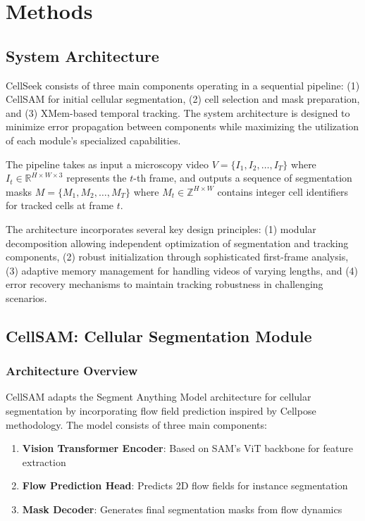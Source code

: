 \documentclass[12pt]{article}
\begin{document}
\section{Methods}

\subsection{System Architecture}


CellSeek consists of three main components operating in a sequential pipeline: (1) CellSAM for initial cellular segmentation, (2) cell selection and mask preparation, and (3) XMem-based temporal tracking. The system architecture is designed to minimize error propagation between components while maximizing the utilization of each module's specialized capabilities.

The pipeline takes as input a microscopy video $V = \{I_1, I_2, \ldots, I_T\}$ where $I_t \in \mathbb{R}^{H \times W \times 3}$ represents the $t$-th frame, and outputs a sequence of segmentation masks $M = \{M_1, M_2, \ldots, M_T\}$ where $M_t \in \mathbb{Z}^{H \times W}$ contains integer cell identifiers for tracked cells at frame $t$.

The architecture incorporates several key design principles: (1) modular decomposition allowing independent optimization of segmentation and tracking components, (2) robust initialization through sophisticated first-frame analysis, (3) adaptive memory management for handling videos of varying lengths, and (4) error recovery mechanisms to maintain tracking robustness in challenging scenarios.

\subsection{CellSAM: Cellular Segmentation Module}

\subsubsection{Architecture Overview}

CellSAM adapts the Segment Anything Model architecture for cellular segmentation by incorporating flow field prediction inspired by Cellpose methodology. The model consists of three main components:

\begin{enumerate}
  \item \textbf{Vision Transformer Encoder}: Based on SAM's ViT backbone for feature extraction
  \item \textbf{Flow Prediction Head}: Predicts 2D flow fields for instance segmentation
  \item \textbf{Mask Decoder}: Generates final segmentation masks from flow dynamics
\end{enumerate}
\end{document}
